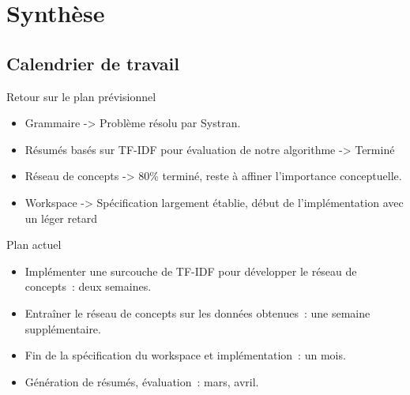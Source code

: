 \documentclass[12pt]{beamer}
\begin{document}
\section{Synthèse}
\subsection{Calendrier de travail}
\begin{frame}
	\begin{block}{Retour sur le plan prévisionnel}
		\begin{itemize}
			\item Grammaire -> Problème résolu par Systran.
			\item Résumés basés sur TF-IDF pour évaluation de notre algorithme -> Terminé
			\item Réseau de concepts -> 80\% terminé, reste à affiner l'importance conceptuelle.
			\item Workspace -> Spécification largement établie, début de l'implémentation avec un léger retard
		\end{itemize}
	\end{block}
\end{frame}

\begin{frame}
	\begin{block}{Plan actuel}
		\begin{itemize}
			\item Implémenter une surcouche de TF-IDF pour développer le réseau de concepts~: deux semaines.
			\item Entraîner le réseau de concepts sur les données obtenues~: une semaine supplémentaire.
			\item Fin de la spécification du workspace et implémentation~: un mois.
			\item Génération de résumés, évaluation~: mars, avril.
		\end{itemize}
	\end{block}
\end{frame}
	
\end{document}

